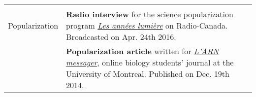 \documentclass[letterpaper,10pt]{article}
\begin{document}
\begin{tabular}{r|p{14cm}}
\multicolumn{2}{c}{} \\

Popularization

& \textbf{Radio interview} for the science popularization program
  \href{http://ici.radio-canada.ca/emissions/les_annees_lumiere/2009-2010/chronique.asp?idChronique=404672}{\emph{Les années lumière}} on Radio-Canada.
  Broadcasted on Apr. 24th 2016.
  \vspace{2mm} \\

& \textbf{Popularization article} written for
  \href{http://arnmessager.com/2014/12/19/les-mots-damour-des-plantes-a-fleurs/}
  {\emph{L'ARN messager}}, online biology students' journal at the
  University of Montreal. Published on Dec. 19th 2014. \\

\end{tabular}

\bigskip


\end{document}
